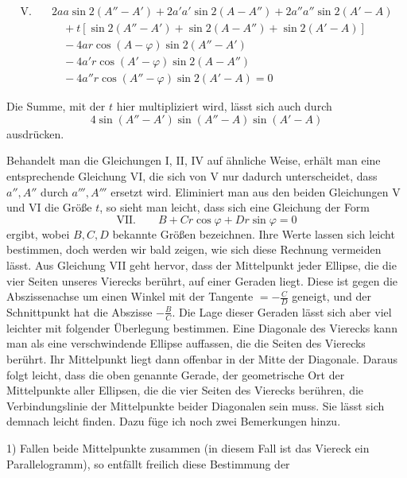 %
\[
\begin{aligned}
\mathrm{V.}\quad&2aa\sin2(A''-A')+2a'a'\sin2(A-A'')+2a''a''\sin2(A'-A)\\
&\quad+t[\sin2(A''-A')+\sin2(A-A'')+\sin2(A'-A)]\\
&\quad-4ar\cos(A-\varphi)\sin2(A''-A')\\
&\quad-4a'r\cos(A'-\varphi)\sin2(A-A'')\\
&\quad-4a''r\cos(A''-\varphi)\sin2(A'-A)=0
\end{aligned}
\]
\par
Die Summe, mit der \(t\) hier multipliziert wird, lässt sich auch durch
\[
4\sin(A''-A')\sin(A''-A)\sin(A'-A)
\]
ausdrücken.

Behandelt man die Gleichungen I, II, IV auf ähnliche Weise, erhält man eine entsprechende Gleichung VI, die sich von V nur dadurch unterscheidet, dass \(a'',A''\) durch \(a''',A'''\) ersetzt wird. Eliminiert man aus den beiden Gleichungen V und VI die Größe \(t\), so sieht man leicht, dass sich eine Gleichung der Form
\[
\mathrm{VII.}\qquad B+Cr\cos\varphi+Dr\sin\varphi=0
\]
ergibt, wobei \(B,C,D\) bekannte Größen bezeichnen. Ihre Werte lassen sich leicht bestimmen, doch werden wir bald zeigen, wie sich diese Rechnung vermeiden lässt. Aus Gleichung VII geht hervor, dass der Mittelpunkt jeder Ellipse, die die vier Seiten unseres Vierecks berührt, auf einer Geraden liegt. Diese ist gegen die Abszissenachse um einen Winkel mit der Tangente \(=-\frac{C}{D}\) geneigt, und der Schnittpunkt hat die Abszisse \(-\frac{B}{C}\). Die Lage dieser Geraden lässt sich aber viel leichter mit folgender Überlegung bestimmen. Eine Diagonale des Vierecks kann man als eine verschwindende Ellipse auffassen, die die Seiten des Vierecks berührt. Ihr Mittelpunkt liegt dann offenbar in der Mitte der Diagonale. Daraus folgt leicht, dass die oben genannte Gerade, der geometrische Ort der Mittelpunkte aller Ellipsen, die die vier Seiten des Vierecks berühren, die Verbindungslinie der Mittelpunkte beider Diagonalen sein muss. Sie lässt sich demnach leicht finden. Dazu füge ich noch zwei Bemerkungen hinzu.

1) Fallen beide Mittelpunkte zusammen (in diesem Fall ist das Viereck ein Parallelogramm), so entfällt freilich diese Bestimmung der
